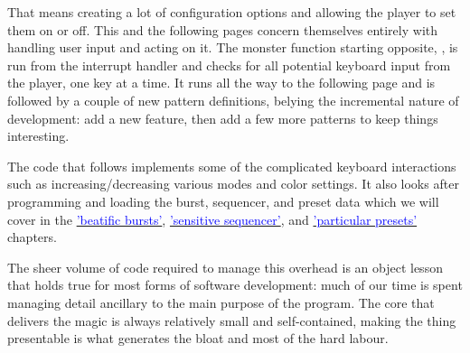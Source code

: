 That means creating a lot of configuration options and allowing the player to set them on or off. This and the following
pages concern themselves entirely with handling user input and acting on it. The monster function starting opposite,
, is run from the interrupt handler and checks for all potential keyboard input from the player,
one key at a time. It runs all the way to the following page and is followed by a couple of new pattern definitions, belying
the incremental nature of development: add a new feature, then add a few more patterns to keep things interesting.

The code that follows implements some of the complicated keyboard interactions such as increasing/decreasing various modes
and color settings. It also looks after programming and loading the burst, sequencer, and preset data which we will cover in the
\hyperref[sec:bursts]{\textcolor{blue}{'beatific bursts'}},
\hyperref[sec:sequencer]{\textcolor{blue}{'sensitive sequencer'}}, and
\hyperref[sec:presets]{\textcolor{blue}{'particular presets'}} chapters.

The sheer volume of code required to manage this overhead is an object lesson that holds true for most forms of software development:
much of our time is spent managing detail ancillary to the main purpose of the program. The core that delivers the magic is always
relatively small and self-contained, making the thing presentable is what generates the bloat and most of the hard labour.


